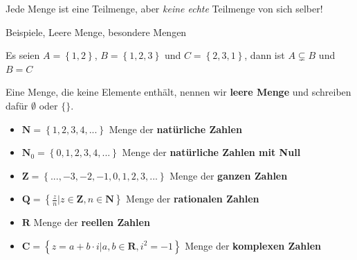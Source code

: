 \documentclass[12pt,ngerman,a4paper,ignorenonframetext,]{beamer}
\providecommand{\tightlist}{%
  \setlength{\itemsep}{0pt}\setlength{\parskip}{0pt}}
\begin{document}
\begin{frame}{}
\protect\hypertarget{section-2}{}

Jede Menge ist eine Teilmenge, aber \emph{keine echte} Teilmenge von
sich selber!

\end{frame}

\begin{frame}{Beispiele, Leere Menge, besondere Mengen}
\protect\hypertarget{beispiele-leere-menge-besondere-mengen}{}


\begin{Beispiel}[]

Es seien \(A=\left\{1, 2 \right\}\), \(B=\left\{1, 2, 3\right\}\) und
\(C=\left\{2, 3, 1\right\}\), dann ist \(A \subsetneq B\) und \(B = C\)

\end{Beispiel}


\begin{definition}

Eine Menge, die keine Elemente enthält, nennen wir \textbf{leere Menge}
und schreiben dafür \(\emptyset\) oder \(\{ \}\).

\end{definition}


\begin{definition}[Zahlenmengen]

\begin{itemize}
\tightlist
\item
  \(\mathbf{N} = \left\{ 1,2,3,4,...\right\}\) Menge der
  \textbf{natürliche Zahlen}
\item
  \(\mathbf{N}_0 = \left\{0, 1,2,3,4,...\right\}\) Menge der
  \textbf{natürliche Zahlen mit Null}
\item
  \(\mathbf{Z} = \left\{ ... ,-3,-2,-1,0,1,2,3,...\right\}\) Menge der
  \textbf{ganzen Zahlen}
\item
  \(\mathbf{Q} = \left\{ \frac{z}{n} | z \in \mathbf{Z}, n \in \mathbf{N} \right\}\)
  Menge der \textbf{rationalen Zahlen}
\item
  \(\mathbf{R}\) Menge der \textbf{reellen Zahlen}
\item
  \(\mathbf{C} = \left\{ z = a + b \cdot i | a,b \in \mathbf{R}, i^2 = -1 \right\}\)
  Menge der \textbf{komplexen Zahlen}
\end{itemize}

\end{definition}

\end{frame}
\end{document}
